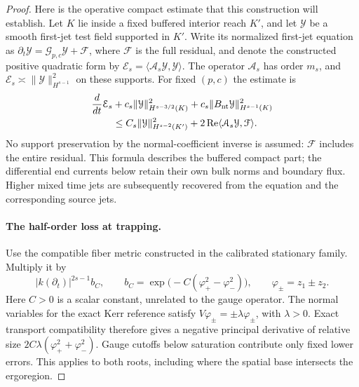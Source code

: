 \begin{proof}
Here is the operative compact estimate that this construction will establish.
Let $K$ lie inside a fixed buffered interior reach $K'$, and let $\mathcal Y$
be a smooth first-jet test field supported in $K'$.  Write its normalized
first-jet equation as $\partial_t\mathcal Y=\mathcal G_{p,c}\mathcal Y
+\mathcal F$, where $\mathcal F$ is the full residual, and denote the
constructed positive quadratic form by
$\mathcal E_s=\langle\mathcal A_s\mathcal Y,\mathcal Y\rangle$.
The operator $\mathcal A_s$ has order $m_s$, and
$\mathcal E_s\asymp\|\mathcal Y\|_{H^{s-1}}^2$ on these supports.
For fixed $(p,c)$ the estimate is
\begin{equation}\label{co2:compact-energy-form}
 \begin{split}
 \frac{d}{dt}\mathcal E_s
 &+c_s\|\mathcal Y\|_{H^{s-3/2}(K)}^2
   +c_s\|B_{\rm nt}\mathcal Y\|_{H^{s-1}(K)}^2\\
 &\le C_s\|\mathcal Y\|_{H^{s-2}(K')}^2
       +2\operatorname{Re}\langle\mathcal A_s\mathcal Y,\mathcal F\rangle.
 \end{split}
\end{equation}
No support preservation by the normal-coefficient inverse is assumed:
$\mathcal F$ includes the entire residual.  This formula describes the
buffered compact part; the differential end currents below retain their own
bulk norms and boundary flux.  Higher mixed time jets are subsequently
recovered from the equation and the corresponding source jets.

\paragraph{The half-order loss at trapping.}
Use the compatible fiber metric constructed in the calibrated stationary
family.  Multiply it by
\begin{equation}\label{co2:trap-weight}
 |k(\partial_t)|^{2s-1}b_C,
 \qquad b_C=\exp\bigl(-C(\varphi_+^2-\varphi_-^2)\bigr),
 \qquad \varphi_\pm=z_1\pm z_2.
\end{equation}
Here $C>0$ is a scalar constant, unrelated to the gauge operator.  The normal
variables for the exact Kerr reference satisfy
$V\varphi_\pm=\pm\lambda\varphi_\pm$, with $\lambda>0$.  Exact
transport compatibility therefore gives a negative principal derivative of
relative size
$2C\lambda(\varphi_+^2+\varphi_-^2)$.  Gauge cutoffs below saturation
contribute only fixed lower errors.  This applies to both roots, including
where the spatial base intersects the ergoregion.


\end{proof}
